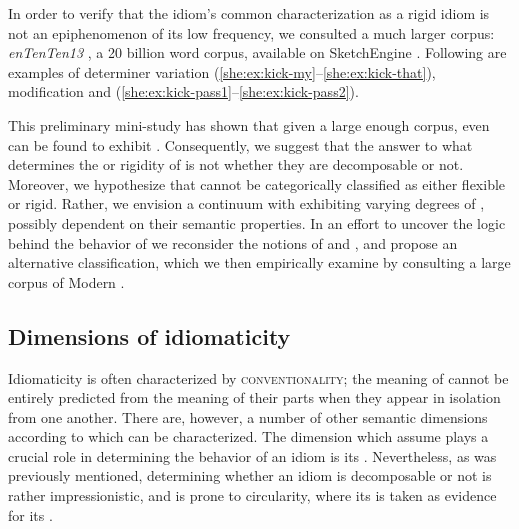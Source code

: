 \documentclass[output=paper]{langsci/langscibook}
\begin{document}
In order to verify that the idiom's common characterization as a rigid idiom is not an epiphenomenon of its low frequency, we consulted a much larger corpus: \emph{enTenTen13} \citep{baroni-bernardini-ferraresi-zanchetta-2009}, a 20 billion word  corpus, available on SketchEngine \citep{sketchengine}. Following are examples of determiner variation (\ref{she:ex:kick-my}--\ref{she:ex:kick-that}), modification  and  (\ref{she:ex:kick-pass1}--\ref{she:ex:kick-pass2}).

\eal
\zl

This preliminary mini-study has shown that given a large enough corpus, even  can be found to exhibit . Consequently, we suggest that the answer to what determines the  or rigidity of  is not whether they are decomposable or not. Moreover, we hypothesize that  cannot be categorically classified as either flexible or rigid. Rather, we envision a continuum with  exhibiting varying degrees of , possibly dependent on their semantic properties.
In an effort to uncover the logic behind the behavior of  we reconsider the notions of  and , and propose an alternative classification, which we then empirically examine by consulting a large corpus of Modern .


\subsection{Dimensions of idiomaticity}
\label{she:sec:semantic-class}
Idiomaticity is often characterized by {\scshape conventionality}; the meaning of  cannot be entirely predicted from the meaning of their parts when they appear in isolation from one another. There are, however, a number of other semantic dimensions according to which  can be characterized. The dimension which \citet[p. 498]{nunberg94} assume plays a crucial role in determining the behavior of an idiom is its . Nevertheless, as was previously mentioned, determining whether an idiom is decomposable or not is rather impressionistic, and is prone to circularity, where its  is taken as evidence for its .
\end{document}

